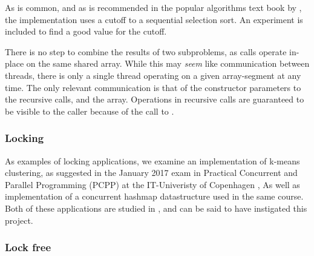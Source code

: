 As is common, and as is recommended in the popular algorithms text book by
\citet{sedgewick}, the implementation uses a cutoff to a sequential selection
sort. An experiment is included to find a good value for the cutoff.

There is no step to combine the results of two subproblems, as calls operate
in-place on the same shared array. While this may \textit{seem} like communication
between threads, there is only a single thread operating on a given
array-segment at any time. The only relevant communication is that of the
constructor parameters to the recursive calls, and the array. Operations in
recursive calls are guaranteed to be visible to the caller because of the
call to .


\subsubsection{Locking }
As examples of locking applications, we examine an implementation of k-means
clustering, as suggested in the January 2017 exam in Practical Concurrent and
Parallel Programming (PCPP) at the IT-Univeristy of Copenhagen \cite{kmeansexam,
kmeansexamcode}, As well as implementation of a concurrent hashmap datastructure
used in the same course. Both of these applications are studied in
\cite{mystery}, and can be said to have instigated this project.


\subsubsection{Lock free}
